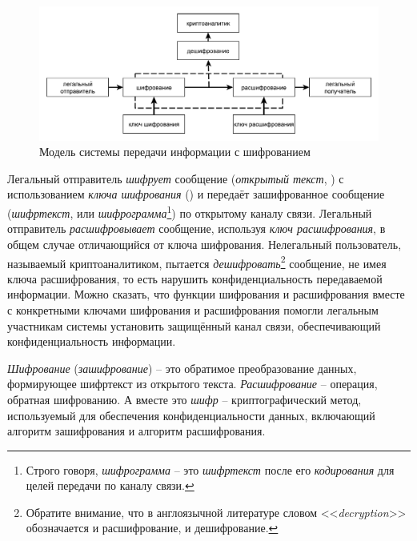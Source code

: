 \begin{figure}[!thb]
	\centering
	\includegraphics[width=1.0\textwidth]{pic/model-cipher}
	\caption{Модель системы передачи информации с шифрованием\label{pic:model-cipher}}
\end{figure}

Легальный отправитель \emph{шифрует} сообщение (\emph{открытый текст}, ) с использованием \emph{ключа шифрования} () и передаёт зашифрованное сообщение (\emph{шифртекст},  или \emph{шифрограмма}\footnote{Строго говоря, \emph{шифрограмма} -- это \emph{шифртекст} после его \emph{кодирования} для целей передачи по каналу связи.}) по открытому каналу связи. Легальный отправитель \emph{расшифровывает} сообщение, используя \emph{ключ расшифрования}, в общем случае отличающийся от ключа шифрования. Нелегальный пользователь, называемый криптоаналитиком, пытается \emph{дешифровать}\footnote{Обратите внимание, что в англоязычной литературе словом <<\textit{decryption}>> обозначается и расшифрование, и дешифрование.} сообщение, не имея ключа расшифрования, то есть нарушить конфиденциальность передаваемой информации. Можно сказать, что функции шифрования и расшифрования вместе с конкретными ключами шифрования и расшифрования помогли легальным участникам системы установить защищённый канал связи, обеспечивающий конфиденциальность информации.

\emph{Шифрование} (\emph{зашифрование}) -- это обратимое преобразование данных, формирующее шифртекст из открытого текста. \emph{Расшифрование} -- операция, обратная шифрованию. А вместе это \emph{шифр} -- криптографический метод, используемый для обеспечения конфиденциальности данных, включающий алгоритм зашифрования и алгоритм расшифрования.~\cite{GOST-89}

